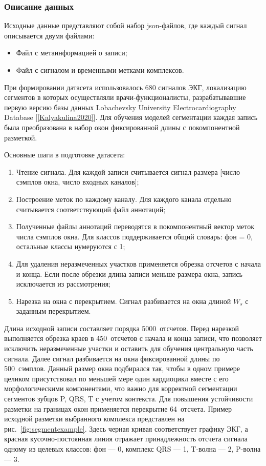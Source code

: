 \documentclass[10pt,a4paper]{book}
\begin{document}
\subsubsection{Описание данных}
Исходные данные представляют собой набор json-файлов, где каждый сигнал описывается двумя файлами:
\begin{itemize}
  \item Файл с метаинформацией о записи;
  \item Файл с сигналом и временными метками комплексов.
\end{itemize}
При формировании датасета использовалось 680 сигналов ЭКГ, локализацию сегментов в которых осуществляли врачи-функционалисты, разрабатывавшие первую версию базы данных Lobachevsky University Electrocardiography Database [\ref{Kalyakulina2020}]. Для обучения моделей сегментации каждая запись была преобразована в набор окон фиксированной длины с покомпонентной разметкой.

Основные шаги в подготовке датасета:
\begin{enumerate}
  \item Чтение сигнала. Для каждой записи считывается сигнал размера [число сэмплов окна, число входных каналов];
  \item Построение меток по каждому каналу. Для каждого канала отдельно считывается соответствующий файл аннотаций;
  \item Полученные файлы аннотаций переводятся в покомпонентный вектор меток числа сэмплов окна. Для классов поддерживается общий словарь: фон = 0, остальные классы нумеруются с 1;
  \item Для удаления неразмеченных участков применяется обрезка отсчетов с начала и конца. Если после обрезки длина записи меньше размера окна, запись исключается из рассмотрения;
  \item Нарезка на окна с перекрытием. Сигнал разбивается на окна длиной $W_s$ с заданным перекрытием.
\end{enumerate}

Длина исходной записи составляет порядка 5000~отсчетов. Перед нарезкой выполняется обрезка краев в 450~отсчетов с начала и конца записи, что позволяет исключить неразмеченные участки и оставить для обучения центральную часть сигнала. Далее сигнал разбивается на окна фиксированной длины по 500~сэмплов. Данный размер окна подбирался так, чтобы в одном примере целиком присутствовал по меньшей мере один кардиоцикл вместе с его морфологическими компонентами, что важно для корректной сегментации сегментов зубцов P, QRS, T с учетом контекста. Для повышения устойчивости разметки на границах окон применяется перекрытие 64~отсчета. Пример исходной разметки выбранного комплекса представлен на рис.~\ref{fig:segmentexample}. Здесь черная кривая соответствует графику ЭКГ, а красная кусочно-постоянная линия отражает принадлежность отсчета сигнала одному из целевых классов: фон --- 0, комплекс QRS --- 1, T-волна --- 2, P-волна --- 3.
\end{document}
